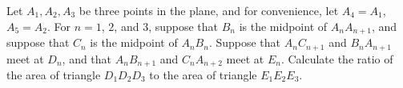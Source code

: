 Let $A_1,A_2,A_3$ be three points in the plane, and for convenience, let $A_4=A_1$, $A_5=A_2$. For $n=1$, $2$, and $3$, suppose that $B_n$ is the midpoint of $A_nA_{n+1}$, and suppose that $C_n$ is the midpoint of $A_nB_n$. Suppose that $A_nC_{n+1}$ and $B_nA_{n+1}$ meet at $D_n$, and that $A_nB_{n+1}$ and $C_nA_{n+2}$ meet at $E_n$. Calculate the ratio of the area of triangle $D_1D_2D_3$ to the area of triangle $E_1E_2E_3$.